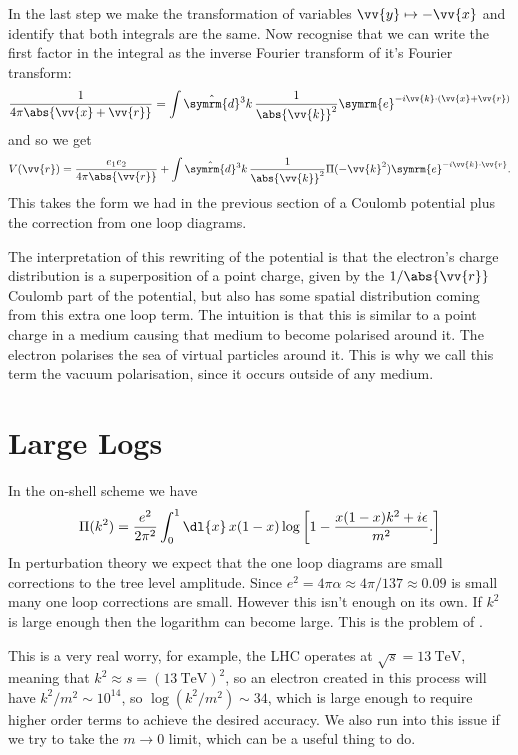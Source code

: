 \documentclass[fleqn]{NotesClass}
\newcommand{\e}{\symrm{e}}
\newcommand{\dhat}[1]{\hat{\symrm{d}}{#1}}
\begin{document}
    In the last step we make the transformation of variables \(\vv{y} \mapsto -\vv{x}\) and identify that both integrals are the same.
    Now recognise that we can write the first factor in the integral as the inverse Fourier transform of it's Fourier transform:
    \begin{equation}
        \frac{1}{4\pi\abs{\vv{x} + \vv{r}}} = \int \dhat{^3k} \, \frac{1}{\abs{\vv{k}}^2} \e^{-i\vv{k} \cdot (\vv{x} + \vv{r})}
    \end{equation}
    and so we get
    \begin{equation}
        V(\vv{r}) = \frac{e_1e_2}{4\pi\abs{\vv{r}}} + \int \dhat{^3k} \, \frac{1}{\abs{\vv{k}}^2} \Pi(-\vv{k}^2) \e^{-i\vv{k} \cdot \vv{r}}.
    \end{equation}
    This takes the form we had in the previous section of a Coulomb potential plus the correction from one loop diagrams.
    
    The interpretation of this rewriting of the potential is that the electron's charge distribution is a superposition of a point charge, given by the \(1/\abs{\vv{r}}\) Coulomb part of the potential, but also has some spatial distribution coming from this extra one loop term.
    The intuition is that this is similar to a point charge in a medium causing that medium to become polarised around it.
    The electron polarises the sea of virtual particles around it.
    This is why we call this term the vacuum polarisation, since it occurs outside of any medium.
    
    \section{Large Logs}
    In the on-shell scheme we have
    \begin{equation}
        \Pi(k^2) = \frac{e^2}{2\pi^2} \int_0^1 \dl{x} \, x(1 - x) \log\left[ 1 - \frac{x(1 - x)k^2 + i\epsilon}{m^2}. \right]
    \end{equation}
    In perturbation theory we expect that the one loop diagrams are small corrections to the tree level amplitude.
    Since \(e^2 = 4\pi \alpha \approx 4\pi/137 \approx 0.09\) is small many one loop corrections are small.
    However this isn't enough on its own.
    If \(k^2\) is large enough then the logarithm can become large.
    This is the problem of .
    
    This is a very real worry, for example, the LHC operates at \(\sqrt{s} = \qty{13}{\tera\electronvolt}\), meaning that \(k^2 \approx s = (\qty{13}{\tera\electronvolt})^2\), so an electron created in this process will have \(k^2/m^2 \sim 10^{14}\), so \(\log(k^2/m^2) \sim 34\), which is large enough to require higher order terms to achieve the desired accuracy.
    We also run into this issue if we try to take the \(m \to 0\) limit, which can be a useful thing to do.
    
\end{document}
